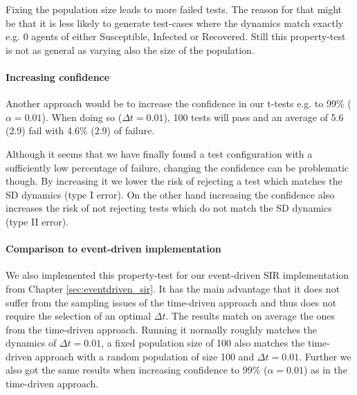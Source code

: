 %

Fixing the population size leads to more failed tests. The reason for that might be that it is less likely to generate test-cases where the dynamics match exactly e.g. 0 agents of either Susceptible, Infected or Recovered. Still this property-test is not as general as varying also the size of the population.

\paragraph{Increasing confidence}
Another approach would be to increase the confidence in our t-tests e.g. to 99\% ($\alpha = 0.01$). When doing so ($\Delta t = 0.01$), 100 tests will pass and an average of 5.6 (2.9) fail with 4.6\% (2.9) of failure.

%
%

Although it seems that we have finally found a test configuration with a sufficiently low percentage of failure, changing the confidence can be problematic though. By increasing it we lower the risk of rejecting a test which matches the SD dynamics (type I error). On the other hand increasing the confidence also increases the risk of not rejecting tests which do not match the SD dynamics (type II error). 

\paragraph{Comparison to event-driven implementation}
We also implemented this property-test for our event-driven SIR implementation from Chapter \ref{sec:eventdriven_sir}. It has the main advantage that it does not suffer from the sampling issues of the time-driven approach and thus does not require the selection of an optimal $\Delta t$.
The results match on average the ones from the time-driven approach. Running it normally roughly matches the dynamics of $\Delta t = 0.01$, a fixed population size of 100 also matches the time-driven approach with a random population of size 100 and $\Delta t = 0.01$. Further we also got the same results when increasing confidence to 99\% ($\alpha = 0.01$) as in the time-driven approach.

